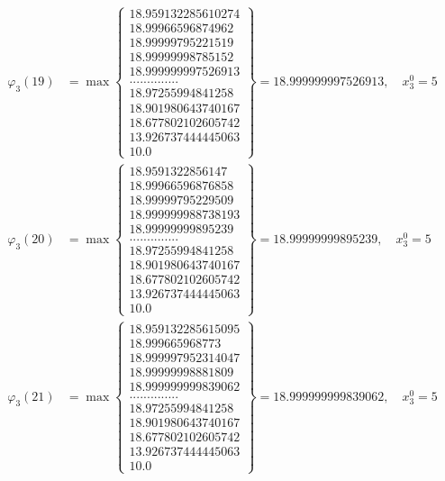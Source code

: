 \documentclass{article}
\begin{document}
\begin{align*}
  
  
  
\varphi_{3}(19) &= \max \left\{ \begin{array}{c}
18.959132285610274 \\
 18.99966596874962 \\
 18.99999795221519 \\
 18.99999998785152 \\
 18.999999997526913 \\
 .............. \\
 18.97255994841258 \\
 18.901980643740167 \\
 18.677802102605742 \\
 13.926737444445063 \\
 10.0
\end{array} \right\} = 18.999999997526913, \quad x_{3}^0 = 5\\
  
  
  
  
\varphi_{3}(20) &= \max \left\{ \begin{array}{c}
18.9591322856147 \\
 18.99966596876858 \\
 18.99999795229509 \\
 18.999999988738193 \\
 18.99999999895239 \\
 .............. \\
 18.97255994841258 \\
 18.901980643740167 \\
 18.677802102605742 \\
 13.926737444445063 \\
 10.0
\end{array} \right\} = 18.99999999895239, \quad x_{3}^0 = 5\\
  
  
  
  
\varphi_{3}(21) &= \max \left\{ \begin{array}{c}
18.959132285615095 \\
 18.999665968773 \\
 18.999997952314047 \\
 18.99999998881809 \\
 18.999999999839062 \\
 .............. \\
 18.97255994841258 \\
 18.901980643740167 \\
 18.677802102605742 \\
 13.926737444445063 \\
 10.0
\end{array} \right\} = 18.999999999839062, \quad x_{3}^0 = 5\\
  

\end{align*}
\end{document}
